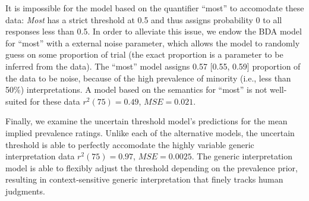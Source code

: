 \documentclass[floatsintext,doc]{apa6}
\theoremstyle{definition}
\theoremstyle{definition}
\theoremstyle{definition}
\theoremstyle{remark}
\begin{document}
It is impossible for the model based on the quantifier \enquote{most} to
accomodate these data: \emph{Most} has a strict threshold at 0.5 and
thus assigns probability 0 to all responses less than 0.5.  In order to
alleviate this issue, we endow the BDA model for \enquote{most} with a
external noise parameter, which allows the model to randomly guess on
some proportion of trial (the exact proportion is a parameter to be
inferred from the data). The \enquote{most} model assigns 0.57 {[}0.55,
0.59{]} proportion of the data to be noise, because of the high
prevalence of minority (i.e., less than 50\%) interpretations. A model
based on the semantics for \enquote{most} is not well-suited for these
data \(r^2(75) = 0.49\), \(MSE = 0.021\).

Finally, we examine the uncertain threshold model's predictions for the
mean implied prevalence ratings. Unlike each of the alternative models,
the uncertain threshold is able to perfectly accomodate the highly
variable generic interpretation data \(r^2(75) = 0.97\),
\(MSE = 0.0025\). The generic interpretation model is able to flexibly
adjust the threshold depending on the prevalence prior, resulting in
context-sensitive generic interpretation that finely tracks human
judgments.
\end{document}
